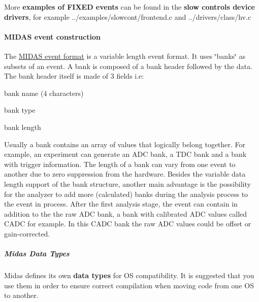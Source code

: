 More {\bfseries examples of FIXED events} can be found in the {\bfseries slow controls device drivers}, for example ../examples/slowcont/frontend.c and ../drivers/class/hv.c

\par
 

 \par
 \label{FE_bank_construction_idx_event_readout_format_midas}
\hypertarget{FE_bank_construction_idx_event_readout_format_midas}{}
 \label{FE_bank_construction_idx_Midas_event-construction}
\hypertarget{FE_bank_construction_idx_Midas_event-construction}{}
 \hypertarget{FE_bank_construction_FE_MIDAS_event_construction}{}\paragraph{MIDAS event construction}\label{FE_bank_construction_FE_MIDAS_event_construction}
The \hyperlink{FE_Data_format_FE_Midas_format}{MIDAS event format} is a variable length event format. It uses \char`\"{}banks\char`\"{} as subsets of an event. A bank is composed of a bank header followed by the data. The bank header itself is made of 3 fields i.e:
\begin{DoxyItemize}
\item bank name (4 characters)
\item bank type
\item bank length
\end{DoxyItemize}

Usually a bank contains an array of values that logically belong together. For example, an experiment can generate an ADC bank, a TDC bank and a bank with trigger information. The length of a bank can vary from one event to another due to zero suppression from the hardware. Besides the variable data length support of the bank structure, another main advantage is the possibility for the analyzer to add more (calculated) banks during the analysis process to the event in process. After the first analysis stage, the event can contain in addition to the the raw ADC bank, a bank with calibrated ADC values called CADC for example. In this CADC bank the raw ADC values could be offset or gain-\/corrected.



\hypertarget{FE_bank_construction_FE_Midas_Data_Types}{}\subparagraph{Midas Data Types}\label{FE_bank_construction_FE_Midas_Data_Types}
Midas defines its own {\bfseries  data types } for OS compatibility. It is suggested that you use them in order to ensure correct compilation when moving code from one OS to another.

